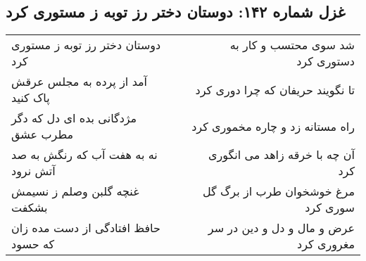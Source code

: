 \begin{center}
\section*{غزل شماره ۱۴۲: دوستان دختر رز توبه ز مستوری کرد}
\label{sec:sh142}
\begin{longtable}{l p{0.5cm} r}
دوستان دختر رز توبه ز مستوری کرد
&&
شد سوی محتسب و کار به دستوری کرد
\\
آمد از پرده به مجلس عرقش پاک کنید
&&
تا نگویند حریفان که چرا دوری کرد
\\
مژدگانی بده ای دل که دگر مطرب عشق
&&
راه مستانه زد و چاره مخموری کرد
\\
نه به هفت آب که رنگش به صد آتش نرود
&&
آن چه با خرقه زاهد می انگوری کرد
\\
غنچه گلبن وصلم ز نسیمش بشکفت
&&
مرغ خوشخوان طرب از برگ گل سوری کرد
\\
حافظ افتادگی از دست مده زان که حسود
&&
عرض و مال و دل و دین در سر مغروری کرد
\\
\end{longtable}
\end{center}

